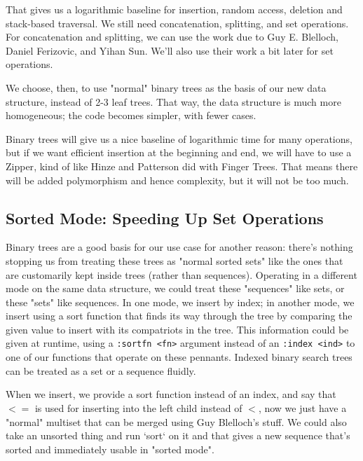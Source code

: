 \documentclass[sigconf]{acmart}
\begin{document}
That gives us a logarithmic baseline for insertion, random access, deletion and
stack-based traversal. We still need concatenation, splitting, and set
operations. For concatenation and splitting, we can use the work due to Guy E.
Blelloch, Daniel Ferizovic, and Yihan Sun\cite{10.1145/3512769}. We'll also use
their work a bit later for set operations\cite{DBLP:journals/corr/BlellochFS16}.

We choose, then, to use "normal" binary trees as the
basis of our new data structure, instead of 2-3 leaf trees. That way, the data
structure is much more homogeneous; the code becomes simpler, with fewer cases.

Binary trees will give us a nice baseline of logarithmic time for many
operations, but if we want efficient insertion at the beginning and end, we will
have to use a Zipper\cite{HUET_1997}, kind of like Hinze and
Patterson\cite{Hinze-Paterson:FingerTree} did with Finger Trees. That means
there will be added polymorphism and hence complexity, but it will not be too
much.


\subsection{Sorted Mode: Speeding Up Set Operations}

Binary trees are a good basis for our use case for another reason: there's
nothing stopping us from treating these trees as "normal sorted sets" like the
ones that are customarily kept inside trees (rather than sequences). Operating
in a different mode on the same data structure, we could treat these "sequences"
like sets, or these "sets" like sequences. In one mode, we insert by index; in
another mode, we insert using a sort function that finds its way through the
tree by comparing the given value to insert with its compatriots in the tree.
This information could be given at runtime, using a \texttt{:sortfn <fn>}
argument instead of an \texttt{:index <ind>} to one of our functions that
operate on these pennants. Indexed binary search trees can be treated as a
set or a sequence fluidly.

When we insert, we provide a sort function instead of an index, and say that
$<=$ is used for inserting into the left child instead of $<$, now we just have
a "normal" multiset that can be merged using Guy Blelloch's stuff. We could
also take an unsorted thing and run `sort` on it and that gives a new sequence
that's sorted and immediately usable in "sorted mode".
\end{document}
